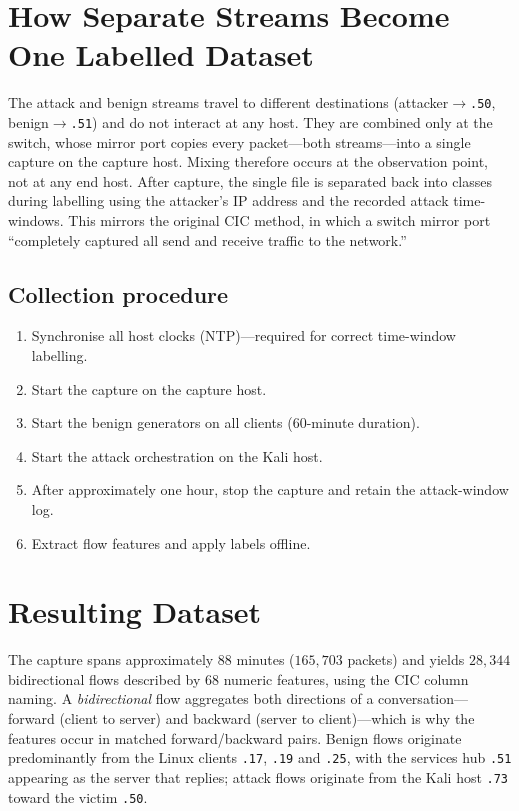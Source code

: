 \documentclass[11pt]{article}
\begin{document}
\section{How Separate Streams Become One Labelled Dataset}
The attack and benign streams travel to different destinations
(attacker$\rightarrow$\texttt{.50}, benign$\rightarrow$\texttt{.51}) and do not
interact at any host. They are combined only at the switch, whose mirror port
copies every packet---both streams---into a single capture on the capture host.
Mixing therefore occurs at the observation point, not at any end host. After
capture, the single file is separated back into classes during labelling using
the attacker's IP address and the recorded attack time-windows. This mirrors the
original CIC method, in which a switch mirror port ``completely captured all send
and receive traffic to the network.''

\subsection{Collection procedure}
\begin{enumerate}
  \item Synchronise all host clocks (NTP)---required for correct time-window
        labelling.
  \item Start the capture on the capture host.
  \item Start the benign generators on all clients (60-minute duration).
  \item Start the attack orchestration on the Kali host.
  \item After approximately one hour, stop the capture and retain the
        attack-window log.
  \item Extract flow features and apply labels offline.
\end{enumerate}

\section{Resulting Dataset}
The capture spans approximately 88 minutes ($165{,}703$ packets) and yields
$28{,}344$ bidirectional flows described by 68 numeric features, using the CIC
column naming. A \emph{bidirectional} flow aggregates both directions of a
conversation---forward (client to server) and backward (server to client)---which
is why the features occur in matched forward/backward pairs. Benign flows
originate predominantly from the Linux clients \texttt{.17}, \texttt{.19} and
\texttt{.25}, with the services hub \texttt{.51} appearing as the server that
replies; attack flows originate from the Kali host \texttt{.73} toward the victim
\texttt{.50}.
\end{document}
